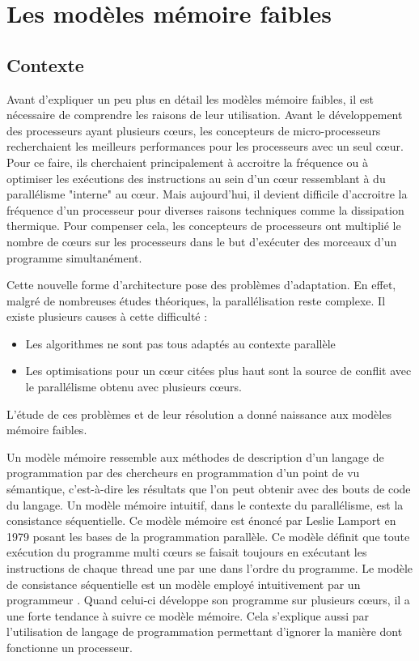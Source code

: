 \documentclass[12pt,a4paper]{article}
\begin{document}

\section{Les modèles mémoire faibles}

\subsection{Contexte}

Avant d'expliquer un peu plus en détail les modèles mémoire faibles, il est nécessaire de comprendre les raisons de leur utilisation. Avant le développement des processeurs ayant plusieurs cœurs, les concepteurs de micro-processeurs recherchaient les meilleurs performances pour les processeurs avec un seul cœur. Pour ce faire, ils cherchaient principalement à accroitre la fréquence ou à optimiser les exécutions des instructions au sein d'un cœur ressemblant à du parallélisme "interne" au cœur. Mais aujourd'hui, il devient difficile d'accroitre la fréquence d'un processeur pour diverses raisons techniques comme la dissipation thermique. Pour compenser cela, les concepteurs de processeurs ont multiplié le nombre de cœurs sur les processeurs dans le but d'exécuter des morceaux d'un programme simultanément.

Cette nouvelle forme d'architecture pose des problèmes d'adaptation. En effet, malgré de nombreuses études théoriques, la parallélisation reste complexe. Il existe plusieurs causes à cette difficulté :
\begin{itemize}
	\item Les algorithmes ne sont pas tous adaptés au contexte parallèle
	\item Les optimisations pour un cœur citées plus haut sont la source de conflit avec le parallélisme obtenu avec plusieurs cœurs. 
\end{itemize}
L'étude de ces problèmes et de leur résolution a donné naissance aux modèles mémoire faibles.

Un modèle mémoire ressemble aux méthodes de description d'un langage de programmation par des chercheurs en programmation d'un point de vu sémantique, c'est-à-dire les résultats que l'on peut obtenir avec des bouts de code du langage. Un modèle mémoire intuitif, dans le contexte du parallélisme, est la consistance séquentielle. Ce modèle mémoire est énoncé par Leslie Lamport en 1979 posant les bases de la programmation parallèle. Ce modèle définit que toute exécution du programme multi cœurs se faisait toujours en exécutant les instructions de chaque thread une par une dans l'ordre du programme. Le modèle de consistance séquentielle est un modèle employé intuitivement par un programmeur \cite{Boehm:2011:YDK:2076796.2088916}. Quand celui-ci développe son programme sur plusieurs cœurs, il a une forte tendance à suivre ce modèle mémoire. Cela s'explique aussi par l'utilisation de langage de programmation permettant d'ignorer la manière dont fonctionne un processeur.  
\end{document}
